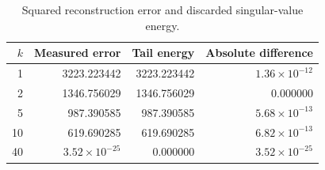 \par
\begin{table}[htbp]\centering
\small
\caption{Squared reconstruction error and discarded singular-value energy.}
\begin{tabular}{rrrr}\toprule
$k$ & Measured error & Tail energy & Absolute difference \\ \midrule
1 & 3223.223442 & 3223.223442 & $1.36\times10^{-12}$ \\
2 & 1346.756029 & 1346.756029 & 0.000000 \\
5 & 987.390585 & 987.390585 & $5.68\times10^{-13}$ \\
10 & 619.690285 & 619.690285 & $6.82\times10^{-13}$ \\
40 & $3.52\times10^{-25}$ & 0.000000 & $3.52\times10^{-25}$ \\
\bottomrule\end{tabular}
\end{table}
\par
